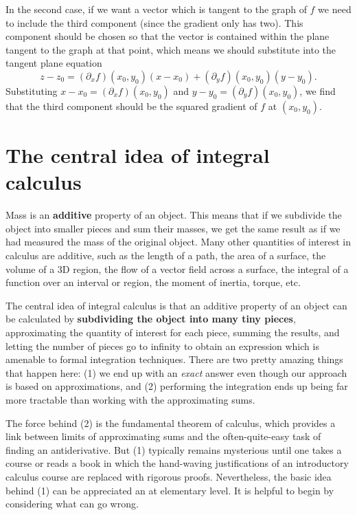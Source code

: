 \documentclass{watsonbook}
\begin{document}
In the second case, if we want a vector which is tangent to the graph
of $f$ we need to include the third component (since the gradient only
has two). This component should be chosen so that the vector is
contained within the plane tangent to the graph at that point, which
means we should substitute into the tangent plane equation
\[
  z - z_0 = (\partial_x f)(x_0,y_0)(x-x_0) +  (\partial_y
  f)(x_0,y_0)(y-y_0). 
\]
Substituting $x-x_0 = (\partial_x f)(x_0,y_0)$ and $y-y_0 =
(\partial_y f)(x_0,y_0)$, we find that the third component should be
the squared gradient of $f$ at $(x_0,y_0)$. 



\newpage 

\section{The central idea of integral calculus} \label{sec:centralidea}

Mass is an \textbf{additive} property of an object. This means that if
we subdivide the object into smaller pieces and sum their masses, we
get the same result as if we had measured the mass of the original
object. Many other quantities of interest in calculus are additive,
such as the length of a path, the area of a surface, the volume of a
3D region, the flow of a vector field across a surface, the integral
of a function over an interval or region, the moment of inertia,
torque, etc.

The central idea of integral calculus is that an additive property of
an object can be calculated by \textbf{subdividing the object into
  many tiny pieces}, approximating the quantity of interest for each
piece, summing the results, and letting the number of pieces go to
infinity to obtain an expression which is amenable to formal
integration techniques. There are two pretty amazing things that
happen here: (1) we end up with an \textit{exact} answer even though
our approach is based on approximations, and (2) performing the
integration ends up being far more tractable than working with the
approximating sums.

The force behind (2) is the fundamental theorem of calculus, which
provides a link between limits of approximating sums and the
often-quite-easy task of finding an antiderivative. But (1) typically
remains mysterious until one takes a course or reads a book in
which the hand-waving justifications of an introductory calculus course
are replaced with rigorous proofs. Nevertheless, the basic idea behind
(1) can be appreciated an at elementary level. It is helpful to begin
by considering what can go wrong. 
\end{document}
